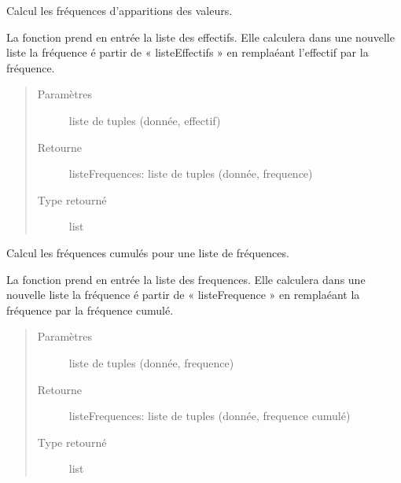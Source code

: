 \documentclass[letterpaper,10pt,french]{sphinxmanual}
\begin{document}

\begin{fulllineitems}
\label{\detokenize{addQualitatives:add.addQualitatives.calculFrequences}}
Calcul les fréquences d’apparitions des valeurs.

La fonction prend en entrée la liste des effectifs. Elle calculera dans une nouvelle liste la fréquence é partir 
de « listeEffectifs » en remplaéant l’effectif par la fréquence.
\begin{quote}\begin{description}
\item[{Paramètres}] \leavevmode
{} \textendash{} liste de tuples (donnée, effectif)

\item[{Retourne}] \leavevmode
listeFrequences: liste de tuples (donnée, frequence)

\item[{Type retourné}] \leavevmode
list

\end{description}\end{quote}

\end{fulllineitems}


\begin{fulllineitems}
\label{\detokenize{addQualitatives:add.addQualitatives.calculFrequencesCumulees}}
Calcul les fréquences cumulés pour une liste de fréquences.

La fonction prend en entrée la liste des frequences. Elle calculera dans une nouvelle liste la fréquence é partir 
de « listeFrequence » en remplaéant la fréquence par la fréquence cumulé.
\begin{quote}\begin{description}
\item[{Paramètres}] \leavevmode
{} \textendash{} liste de tuples (donnée, frequence)

\item[{Retourne}] \leavevmode
listeFrequences: liste de tuples (donnée, frequence cumulé)

\item[{Type retourné}] \leavevmode
list

\end{description}\end{quote}

\end{fulllineitems}
\end{document}
